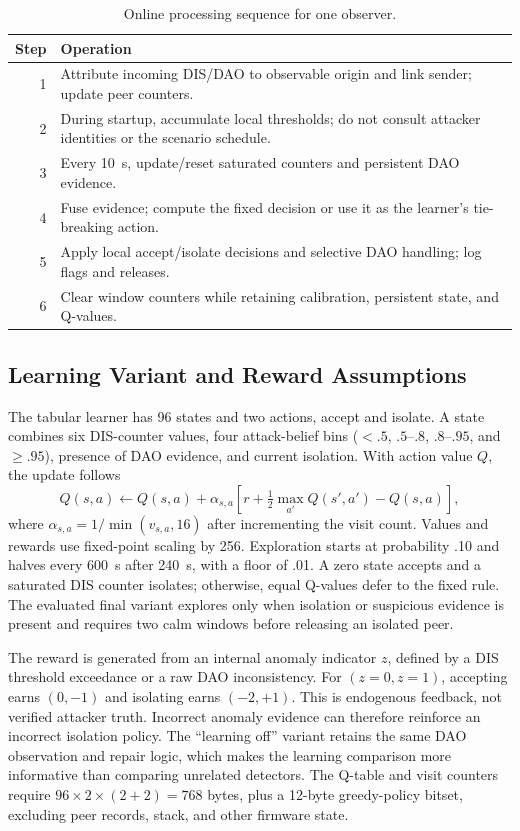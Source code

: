 \begin{table}[t]
\caption{Online processing sequence for one observer.}\label{tab:algorithm}
\centering\footnotesize
\begin{tabularx}{\columnwidth}{@{}rX@{}}\toprule
Step & Operation \\\midrule
1 & Attribute incoming DIS/DAO to observable origin and link sender; update peer counters.\\
2 & During startup, accumulate local thresholds; do not consult attacker identities or the scenario schedule.\\
3 & Every 10~s, update/reset saturated counters and persistent DAO evidence.\\
4 & Fuse evidence; compute the fixed decision or use it as the learner's tie-breaking action.\\
5 & Apply local accept/isolate decisions and selective DAO handling; log flags and releases.\\
6 & Clear window counters while retaining calibration, persistent state, and Q-values.\\\bottomrule
\end{tabularx}
\end{table}

\subsection{Learning Variant and Reward Assumptions}
The tabular learner has 96 states and two actions, accept and isolate. A state combines six DIS-counter values, four attack-belief bins ($<.5$, $.5$--$.8$, $.8$--$.95$, and $\ge.95$), presence of DAO evidence, and current isolation. With action value $Q$, the update follows \cite{watkins1992}
\begin{equation}
 Q(s,a)\leftarrow Q(s,a)+\alpha_{s,a}\left[r+\tfrac12\max_{a'}Q(s',a')-Q(s,a)\right],
\end{equation}
where $\alpha_{s,a}=1/\min(v_{s,a},16)$ after incrementing the visit count. Values and rewards use fixed-point scaling by 256. Exploration starts at probability .10 and halves every 600~s after 240~s, with a floor of .01. A zero state accepts and a saturated DIS counter isolates; otherwise, equal Q-values defer to the fixed rule. The evaluated final variant explores only when isolation or suspicious evidence is present and requires two calm windows before releasing an isolated peer.

The reward is generated from an internal anomaly indicator $z$, defined by a DIS threshold exceedance or a raw DAO inconsistency. For $(z=0,z=1)$, accepting earns $(0,-1)$ and isolating earns $(-2,+1)$. This is endogenous feedback, not verified attacker truth. Incorrect anomaly evidence can therefore reinforce an incorrect isolation policy. The ``learning off'' variant retains the same DAO observation and repair logic, which makes the learning comparison more informative than comparing unrelated detectors. The Q-table and visit counters require $96\times2\times(2+2)=768$ bytes, plus a 12-byte greedy-policy bitset, excluding peer records, stack, and other firmware state.

